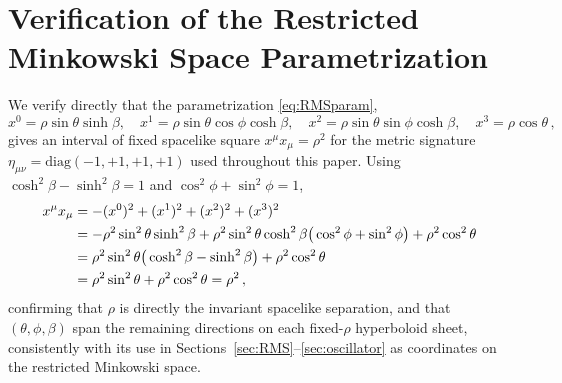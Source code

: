 \documentclass[11pt]{article}
\begin{document}
\section{Verification of the Restricted Minkowski Space Parametrization}
\label{app:rms}

We verify directly that the parametrization \eqref{eq:RMSparam},
\[
x^0=\rho\sin\theta\sinh\beta,\quad
x^1=\rho\sin\theta\cos\phi\cosh\beta,\quad
x^2=\rho\sin\theta\sin\phi\cosh\beta,\quad
x^3=\rho\cos\theta\,,
\]
gives an interval of fixed spacelike square $x^\mu x_\mu=\rho^2$ for the metric
signature $\eta_{\mu\nu}=\mathrm{diag}(-1,+1,+1,+1)$ used throughout this paper. Using
$\cosh^2\beta-\sinh^2\beta=1$ and $\cos^2\phi+\sin^2\phi=1$,
\begin{align}
x^\mu x_\mu&=-(x^0)^2+(x^1)^2+(x^2)^2+(x^3)^2\notag\\
&=-\rho^2\sin^2\theta\sinh^2\beta
+\rho^2\sin^2\theta\cosh^2\beta\big(\cos^2\phi+\sin^2\phi\big)
+\rho^2\cos^2\theta\notag\\
&=\rho^2\sin^2\theta\big(\cosh^2\beta-\sinh^2\beta\big)+\rho^2\cos^2\theta\notag\\
&=\rho^2\sin^2\theta+\rho^2\cos^2\theta=\rho^2\,,
\end{align}
confirming that $\rho$ is directly the invariant spacelike separation, and that
$(\theta,\phi,\beta)$ span the remaining directions on each fixed-$\rho$
hyperboloid sheet, consistently with its use in
Sections~\ref{sec:RMS}--\ref{sec:oscillator} as coordinates on the restricted
Minkowski space.
\end{document}
